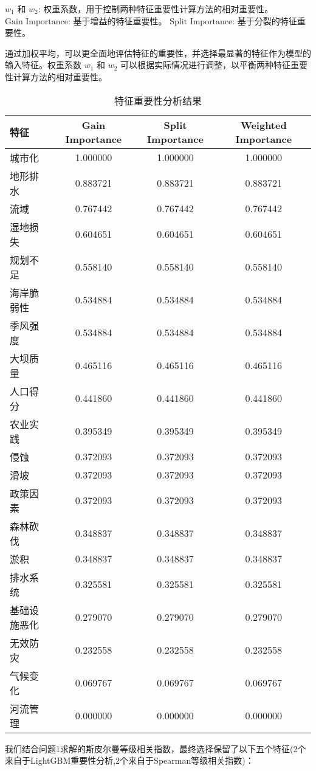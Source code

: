 \documentclass[withoutpreface,bwprint]{cumcmthesis} %
\begin{document}
	  $w_1$ 和 $w_2$: 权重系数，用于控制两种特征重要性计算方法的相对重要性。
	   $\text{Gain Importance}$: 基于增益的特征重要性。
	   $\text{Split Importance}$: 基于分裂的特征重要性。
	
	通过加权平均，可以更全面地评估特征的重要性，并选择最显著的特征作为模型的输入特征。权重系数 $w_1$ 和 $w_2$ 可以根据实际情况进行调整，以平衡两种特征重要性计算方法的相对重要性。
	

\begin{longtable}{lccc}
	\caption{特征重要性分析结果} \\
	\hline
	\textbf{特征} & \textbf{Gain Importance} & \textbf{Split Importance} & \textbf{Weighted Importance} \\
	\hline
	城市化 & 1.000000 & 1.000000 & 1.000000 \\
	地形排水 & 0.883721 & 0.883721 & 0.883721 \\
	流域 & 0.767442 & 0.767442 & 0.767442 \\
	湿地损失 & 0.604651 & 0.604651 & 0.604651 \\
	规划不足 & 0.558140 & 0.558140 & 0.558140 \\
	海岸脆弱性 & 0.534884 & 0.534884 & 0.534884 \\
	季风强度 & 0.534884 & 0.534884 & 0.534884 \\
	大坝质量 & 0.465116 & 0.465116 & 0.465116 \\
	人口得分 & 0.441860 & 0.441860 & 0.441860 \\
	农业实践 & 0.395349 & 0.395349 & 0.395349 \\
	侵蚀 & 0.372093 & 0.372093 & 0.372093 \\
	滑坡 & 0.372093 & 0.372093 & 0.372093 \\
	政策因素 & 0.372093 & 0.372093 & 0.372093 \\
	森林砍伐 & 0.348837 & 0.348837 & 0.348837 \\
	淤积 & 0.348837 & 0.348837 & 0.348837 \\
	排水系统 & 0.325581 & 0.325581 & 0.325581 \\
	基础设施恶化 & 0.279070 & 0.279070 & 0.279070 \\
	无效防灾 & 0.232558 & 0.232558 & 0.232558 \\
	气候变化 & 0.069767 & 0.069767 & 0.069767 \\
	河流管理 & 0.000000 & 0.000000 & 0.000000 \\
	\hline
\end{longtable}

我们结合问题1求解的斯皮尔曼等级相关指数，最终选择保留了以下五个特征(2个来自于LightGBM重要性分析,2个来自于Spearman等级相关指数)：
\end{document}
